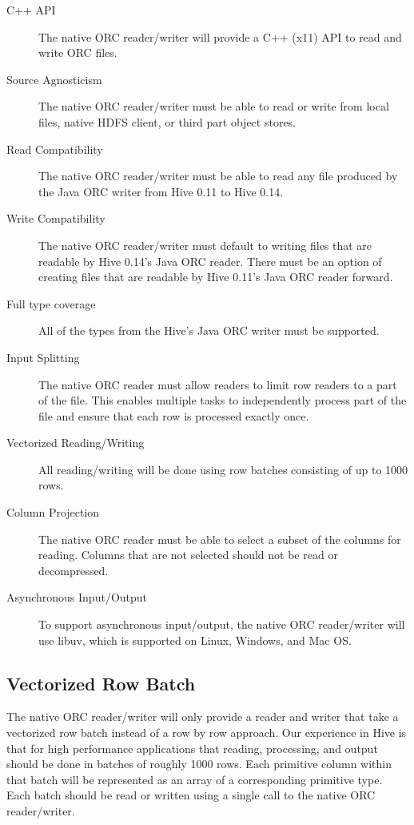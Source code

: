 \documentclass{article}
\begin{document}
\begin{description}
\item [C++ API] The native ORC reader/writer will provide a C++ (x11) API
  to read and write ORC files.
\item [Source Agnosticism] The native ORC reader/writer must be able to
  read or write from local files, native HDFS client, or third part
  object stores.
\item [Read Compatibility] The native ORC reader/writer must be able
  to read any file produced by the Java ORC writer from Hive 0.11 to
  Hive 0.14.
\item [Write Compatibility] The native ORC reader/writer must default
  to writing files that are readable by Hive 0.14's Java ORC reader.
  There must be an option of creating files that are readable by Hive
  0.11's Java ORC reader forward.
\item [Full type coverage] All of the types from the Hive's Java ORC
  writer must be supported.
\item [Input Splitting] The native ORC reader must allow readers to
  limit row readers to a part of the file. This enables multiple tasks
  to independently process part of the file and ensure that each row
  is processed exactly once.
\item [Vectorized Reading/Writing] All reading/writing will be done
  using row batches consisting of up to 1000 rows.
\item [Column Projection] The native ORC reader must be able to select
  a subset of the columns for reading. Columns that are not selected should
  not be read or decompressed.
\item [Asynchronous Input/Output] To support asynchronous input/output, the
  native ORC reader/writer will use libuv, which is supported on Linux,
  Windows, and Mac OS.
\end{description}

\subsection{Vectorized Row Batch}

The native ORC reader/writer will only provide a reader and writer
that take a vectorized row batch instead of a row by row approach. Our
experience in Hive is that for high performance applications that
reading, processing, and output should be done in batches of roughly
1000 rows. Each primitive column within that batch will be represented
as an array of a corresponding primitive type. Each batch should be
read or written using a single call to the native ORC reader/writer.
\end{document}
